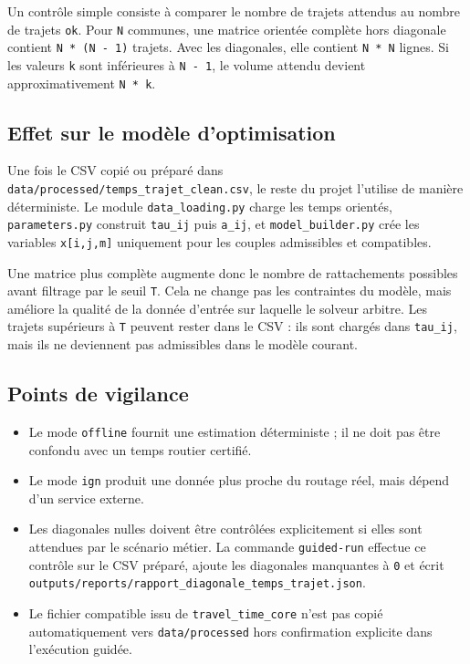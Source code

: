 \documentclass[11pt,a4paper]{article}
\begin{document}
Un contrôle simple consiste à comparer le nombre de trajets attendus au nombre
de trajets \texttt{ok}. Pour \texttt{N} communes, une matrice orientée complète
hors diagonale contient \texttt{N * (N - 1)} trajets. Avec les diagonales, elle
contient \texttt{N * N} lignes. Si les valeurs \texttt{k} sont inférieures à
\texttt{N - 1}, le volume attendu devient approximativement \texttt{N * k}.

\subsection{Effet sur le modèle d'optimisation}

Une fois le CSV copié ou préparé dans
\texttt{data/processed/temps\_trajet\_clean.csv}, le reste du projet l'utilise
de manière déterministe. Le module \texttt{data\_loading.py} charge les temps
orientés, \texttt{parameters.py} construit \texttt{tau\_ij} puis
\texttt{a\_ij}, et \texttt{model\_builder.py} crée les variables
\texttt{x[i,j,m]} uniquement pour les couples admissibles et compatibles.

Une matrice plus complète augmente donc le nombre de rattachements possibles
avant filtrage par le seuil \texttt{T}. Cela ne change pas les contraintes du
modèle, mais améliore la qualité de la donnée d'entrée sur laquelle le solveur
arbitre. Les trajets supérieurs à \texttt{T} peuvent rester dans le CSV : ils
sont chargés dans \texttt{tau\_ij}, mais ils ne deviennent pas admissibles dans
le modèle courant.

\subsection{Points de vigilance}

\begin{itemize}
\item Le mode \texttt{offline} fournit une estimation déterministe ; il ne doit
  pas être confondu avec un temps routier certifié.
\item Le mode \texttt{ign} produit une donnée plus proche du routage réel, mais
  dépend d'un service externe.
\item Les diagonales nulles doivent être contrôlées explicitement si elles sont
  attendues par le scénario métier. La commande \texttt{guided-run} effectue ce
  contrôle sur le CSV préparé, ajoute les diagonales manquantes à \texttt{0} et
  écrit \texttt{outputs/reports/rapport\_diagonale\_temps\_trajet.json}.
\item Le fichier compatible issu de \texttt{travel\_time\_core} n'est pas copié
  automatiquement vers \texttt{data/processed} hors confirmation explicite dans
  l'exécution guidée.
\end{itemize}
\end{document}

